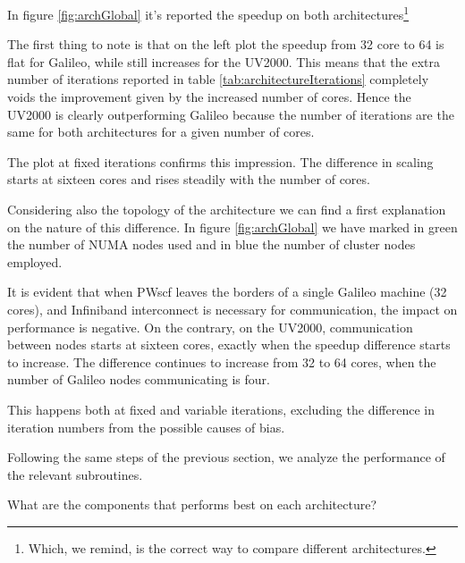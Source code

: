 \documentclass[a4paper,12pt]{article}
\begin{document}
In figure \ref{fig:archGlobal} it's reported the speedup on both architectures\footnote{Which, we remind, is the correct way to compare different architectures.}



The first thing to note is that on the left plot the speedup from 32 core to 64 is flat for Galileo, while still increases for the UV2000. 
This means that the extra number of iterations reported in table \ref{tab:architectureIterations} completely voids the improvement given by the increased number of cores. 
Hence the UV2000 is clearly outperforming Galileo because the number of iterations are the same for both architectures for a given number of cores.

The plot at fixed iterations confirms this impression. 
The difference in scaling starts at sixteen cores and rises steadily with the number of cores.

Considering also the topology of the architecture we can find a first explanation on the nature of this difference.
In figure \ref{fig:archGlobal} we have marked in green the number of NUMA nodes used and in blue the number of cluster nodes employed.

It is evident that when PWscf leaves the borders of a single Galileo machine (32 cores), and Infiniband interconnect is necessary for communication, the impact on performance is negative.
On the contrary, on the UV2000, communication between nodes starts at sixteen cores, exactly when the speedup difference starts to increase.
The difference continues to increase from 32 to 64 cores, when the number of Galileo nodes communicating is four.

This happens both at fixed and variable iterations, excluding the difference in iteration numbers from the possible causes of bias.

Following the same steps of the previous section, we analyze the performance of the relevant subroutines.


\begin{center}
\begin{framed}
What are the components that performs best on each architecture?
\end{framed}
\end{center}
\end{document}
